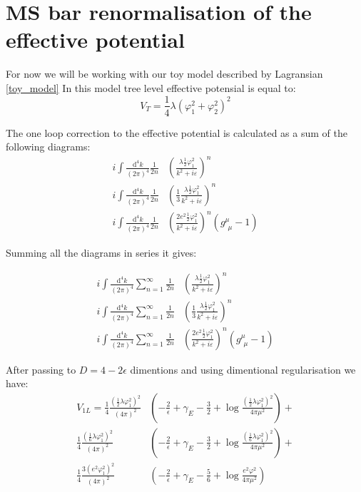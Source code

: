 \chapter{MS bar renormalisation of the effective potential}

For now we will be working with our toy model described by Lagransian \ref{toy_model}
In this model tree level effective potensial is equal to:
\begin{equation}
V_T = \frac{1}{4}\lambda(\varphi_1^2+\varphi_2^2)^2
\end{equation}


The one loop correction to the effective potential is calculated as a sum of the following diagrams:
\\
\begin{align}
i\int \frac{\textrm{d}^4k}{(2\pi)^4}\frac{1}{2n}&\left(\frac{\lambda\frac{1}{2}\varphi_1^2}
{k^2+i\varepsilon}\right)^n \\
i\int \frac{\textrm{d}^4k}{(2\pi)^4}\frac{1}{2n}&\left(\frac{1}{3}\frac{\lambda\frac{1}
{2}\varphi_1^2}
{k^2+i\varepsilon}\right)^n \\
i\int \frac{\textrm{d}^4k}{(2\pi)^4}\frac{1}{2n}&\left(\frac{2e^2\frac{1}{2}\varphi_1^2}
{k^2+i\varepsilon}\right)^n(g^\mu_{\ \,\mu} - 1)
\end{align}

Summing all the diagrams in series it gives:

\begin{align}
i\int \frac{\textrm{d}^4k}{(2\pi)^4}\sum\limits_{n=1}^{\infty}
\frac{1}{2n}&\left(\frac{\lambda\frac{1}{2}\varphi_1^2}
{k^2+i\varepsilon}\right)^n \\
i\int \frac{\textrm{d}^4k}{(2\pi)^4}\sum\limits_{n=1}^{\infty}\frac{1}{2n}&
\left(\frac{1}{3}\frac{\lambda\frac{1}{2}\varphi_1^2}
{k^2+i\varepsilon}\right)^n \\
i\int \frac{\textrm{d}^4k}{(2\pi)^4}\sum\limits_{n=1}^{\infty}\frac{1}{2n}&
\left(\frac{2e^2\frac{1}{2}\varphi_1^2}
{k^2+i\varepsilon}\right)^n(g^\mu_{\ \,\mu} - 1)
\end{align}

After passing to $D=4-2\epsilon$ dimentions and using dimentional regularisation we have:
\begin{align}
V_{1L}=\frac{1}{4}\frac{(\frac{1}{2}\lambda\varphi_1^2)^2}{(4\pi)^2}&\left(-\frac{2}{\epsilon}
+\gamma_E-\frac{3}{2}+\log{\frac{(\frac{1}{2}\lambda\varphi_1^2)^2}{4\pi\mu^2}}\right) + \\
\frac{1}{4}\frac{(\frac{1}{6}\lambda\varphi_1^2)^2}{(4\pi)^2}&\left(-\frac{2}{\epsilon}
+\gamma_E-\frac{3}{2}+\log{\frac{(\frac{1}{6}\lambda\varphi_1^2)^2}{4\pi\mu^2}}\right) + \\
\frac{1}{4}\frac{3(e^2\varphi_1^2)^2}{(4\pi)^2}&\left(-\frac{2}{\epsilon}+\gamma_E
-\frac{5}{6}+\log{\frac{e^2\varphi^2}{4\pi\mu^2}}\right)
\end{align}

